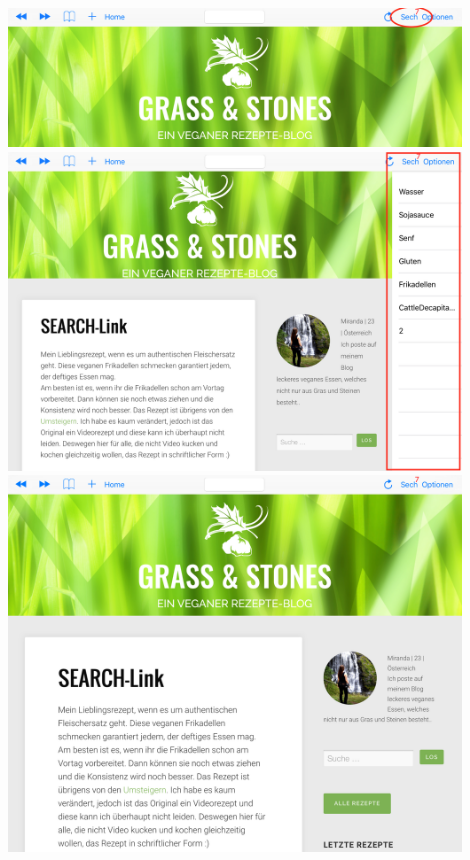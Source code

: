 \includegraphics[width=12cm]{Pics/Sech_Anzahl}
\newpage
\includegraphics[width=12cm]{Pics/Sech_Tabelle_aufgeklappt}
\newpage
\includegraphics[width=12cm]{Pics/Sech_Tabelle_versteckt}


